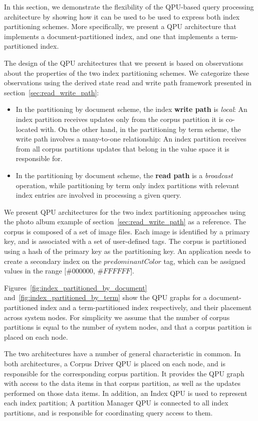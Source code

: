 In this section, we demonstrate the flexibility of the QPU-based query processing architecture by showing how it can be used to
be used to express both index partitioning schemes.
More specifically,
we present a QPU architecture that implements a document-partitioned index,
and one that implements a term-partitioned index.

The design of the QPU architectures that we present is based on observations about the properties of the two index partitioning schemes.
We categorize these observations using the derived state read and write path framework presented in
section~\ref{sec:read_write_path}:
\begin{itemize}
  \item In the partitioning by document scheme,
  the index \textbf{write path} is \textit{local}:
  An index partition receives updates only from the corpus partition it is co-located with.
  On the other hand, in the partitioning by term scheme,
  the write path involves a many-to-one relationship:
  An index partition receives from all corpus partitions updates that belong in the value space it is responsible for.

  \item In the partitioning by document scheme,
  the \textbf{read path} is a \textit{broadcast} operation,
  while partitioning by term
  only index partitions with relevant index entries are involved in processing a given query.
\end{itemize}

We present QPU architectures for the two index partitioning approaches using the photo album example of section~\ref{sec:read_write_path} as a reference.
The corpus is composed of a set of image files.
Each image is identified by a primary key, and is associated with a set of user-defined tags.
The corpus is partitioned using a hash of the primary key as the partitioning key.
An application needs to create a secondary index on the $predominantColor$ tag, which can be assigned values in the range $[\#000000$, $\#FFFFFF$].

Figures~\ref{fig:index_partitioned_by_document} and~\ref{fig:index_partitioned_by_term} show the QPU graphs for a
document-partitioned index and a term-partitioned index respectively, and their placement across system nodes.
For simplicity we assume that the number of corpus partitions is equal to the number of system nodes,
and that a corpus partition is placed on each node.

The two architectures have a number of general characteristic in common.
In both architectures, a Corpus Driver QPU is placed on each node,
and is responsible for the corresponding corpus partition.
It provides the QPU graph with access to the data items in that corpus partition,
as well as the updates performed on those data items.
In addition, an Index QPU is used to represent each index partition;
A partition Manager QPU is connected to all index partitions,
and is responsible for coordinating query access to them.

